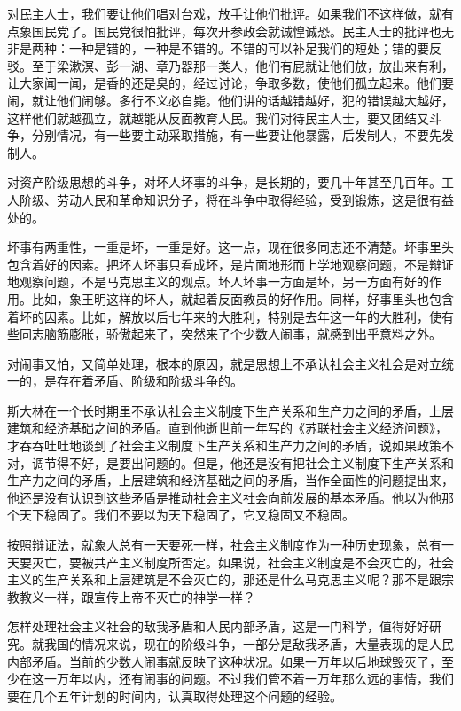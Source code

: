 对民主人士，我们要让他们唱对台戏，放手让他们批评。如果我们不这样做，就有点象国民党了。国民党很怕批评，每次开参政会就诚惶诚恐。民主人士的批评也无非是两种：一种是错的，一种是不错的。不错的可以补足我们的短处；错的要反驳。至于梁漱溟、彭一湖、章乃器那一类人，他们有屁就让他们放，放出来有利，让大家闻一闻，是香的还是臭的，经过讨论，争取多数，使他们孤立起来。他们要闹，就让他们闹够。多行不义必自毙。他们讲的话越错越好，犯的错误越大越好，这样他们就越孤立，就越能从反面教育人民。我们对待民主人士，要又团结又斗争，分别情况，有一些要主动采取措施，有一些要让他暴露，后发制人，不要先发制人。

对资产阶级思想的斗争，对坏人坏事的斗争，是长期的，要几十年甚至几百年。工人阶级、劳动人民和革命知识分子，将在斗争中取得经验，受到锻炼，这是很有益处的。

坏事有两重性，一重是坏，一重是好。这一点，现在很多同志还不清楚。坏事里头包含着好的因素。把坏人坏事只看成坏，是片面地形而上学地观察问题，不是辩证地观察问题，不是马克思主义的观点。坏人坏事一方面是坏，另一方面有好的作用。比如，象王明这样的坏人，就起着反面教员的好作用。同样，好事里头也包含着坏的因素。比如，解放以后七年来的大胜利，特别是去年这一年的大胜利，使有些同志脑筋膨胀，骄傲起来了，突然来了个少数人闹事，就感到出乎意料之外。

对闹事又怕，又简单处理，根本的原因，就是思想上不承认社会主义社会是对立统一的，是存在着矛盾、阶级和阶级斗争的。

斯大林在一个长时期里不承认社会主义制度下生产关系和生产力之间的矛盾，上层建筑和经济基础之间的矛盾。直到他逝世前一年写的《苏联社会主义经济问题》，才吞吞吐吐地谈到了社会主义制度下生产关系和生产力之间的矛盾，说如果政策不对，调节得不好，是要出问题的。但是，他还是没有把社会主义制度下生产关系和生产力之间的矛盾，上层建筑和经济基础之间的矛盾，当作全面性的问题提出来，他还是没有认识到这些矛盾是推动社会主义社会向前发展的基本矛盾。他以为他那个天下稳固了。我们不要以为天下稳固了，它又稳固又不稳固。

按照辩证法，就象人总有一天要死一样，社会主义制度作为一种历史现象，总有一天要灭亡，要被共产主义制度所否定。如果说，社会主义制度是不会灭亡的，社会主义的生产关系和上层建筑是不会灭亡的，那还是什么马克思主义呢？那不是跟宗教教义一样，跟宣传上帝不灭亡的神学一样？

怎样处理社会主义社会的敌我矛盾和人民内部矛盾，这是一门科学，值得好好研究。就我国的情况来说，现在的阶级斗争，一部分是敌我矛盾，大量表现的是人民内部矛盾。当前的少数人闹事就反映了这种状况。如果一万年以后地球毁灭了，至少在这一万年以内，还有闹事的问题。不过我们管不着一万年那么远的事情，我们要在几个五年计划的时间内，认真取得处理这个问题的经验。

